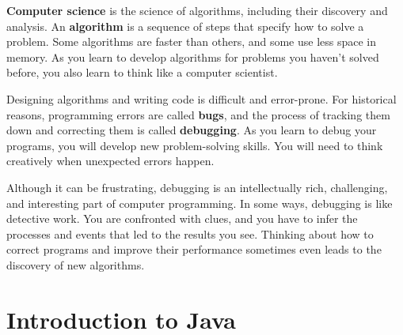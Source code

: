 \documentclass[12pt]{book}
\theoremstyle{exercise}
\begin{document}

{\bf Computer science} is the science of algorithms, including their discovery and analysis.
An {\bf algorithm} is a sequence of steps that specify how to solve a problem.
Some algorithms are faster than others, and some use less space in memory.
As you learn to develop algorithms for problems you haven't solved before, you also learn to think like a computer scientist.


Designing algorithms and writing code is difficult and error-prone.
For historical reasons, programming errors are called {\bf bugs}, and the process of tracking them down and correcting them is called {\bf debugging}.
As you learn to debug your programs, you will develop new problem-solving skills.
You will need to think creatively when unexpected errors happen.




Although it can be frustrating, debugging is an intellectually rich, challenging, and interesting part of computer programming.
In some ways, debugging is like detective work.
You are confronted with clues, and you have to infer the processes and events that led to the results you see.
Thinking about how to correct programs and improve their performance sometimes even leads to the discovery of new algorithms.


\section{Introduction to Java}
\end{document}

